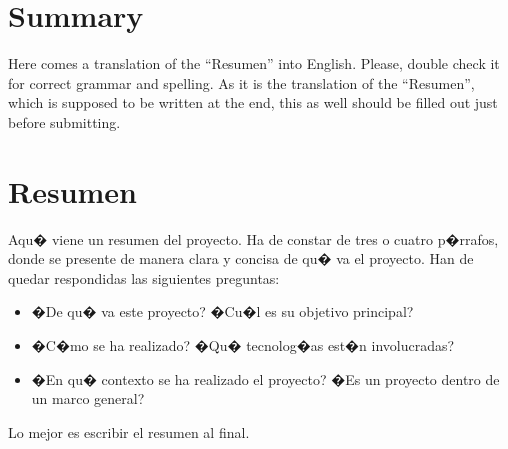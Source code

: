 \documentclass[a4paper, 12pt]{book}
\begin{document}

\chapter*{Summary}

Here comes a translation of the ``Resumen'' into English. Please, double check
it for correct grammar and spelling. As it is the translation of the ``Resumen'',
which is supposed to be written at the end, this as well should be filled out
just before submitting.



\chapter*{Resumen}

Aqu� viene un resumen del proyecto. Ha de constar de tres o cuatro p�rrafos,
donde se presente de manera clara y concisa de qu� va el proyecto. Han
de quedar respondidas las siguientes preguntas:

\begin{itemize}
  \item �De qu� va este proyecto? �Cu�l es su objetivo principal?
  \item �C�mo se ha realizado? �Qu� tecnolog�as est�n involucradas?
  \item �En qu� contexto se ha realizado el proyecto? �Es un proyecto
dentro de un marco general?
\end{itemize}

Lo mejor es escribir el resumen al final.


\end{document}
